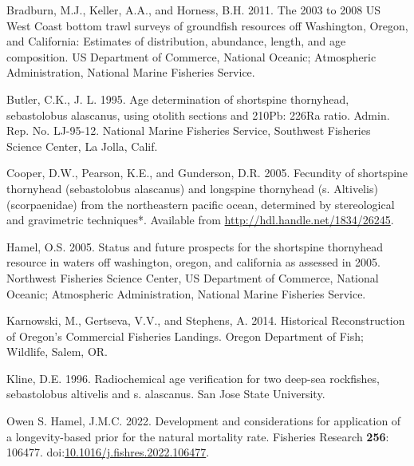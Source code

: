 \documentclass[11pt,
  english,
  letterpaper,
]{article}
\newlength{\cslhangindent}
\newenvironment{CSLReferences}[2] %
 {%
  \setlength{\parindent}{0pt}
  \ifodd #1 \everypar{\setlength{\hangindent}{\cslhangindent}}\ignorespaces\fi
  \ifnum #2 > 0
  \setlength{\parskip}{#2\baselineskip}
  \fi
 }%
 {}
\begin{document}
\hypertarget{refs}{}
\begin{CSLReferences}{1}{0}
\leavevmode{}%
Bradburn, M.J., Keller, A.A., and Horness, B.H. 2011. The 2003 to 2008 {US} {West} {Coast} bottom trawl surveys of groundfish resources off {Washington}, {Oregon}, and {California}: Estimates of distribution, abundance, length, and age composition. US Department of Commerce, National Oceanic; Atmospheric Administration, National Marine Fisheries Service.

\leavevmode{}%
Butler, C.K., J. L. 1995. Age determination of shortspine thornyhead, sebastolobus alascanus, using otolith sections and 210Pb: 226Ra ratio. Admin. Rep. No. LJ-95-12. National Marine Fisheries Service, Southwest Fisheries Science Center, La Jolla, Calif.

\leavevmode{}%
Cooper, D.W., Pearson, K.E., and Gunderson, D.R. 2005. Fecundity of shortspine thornyhead (sebastolobus alascanus) and longspine thornyhead (s. Altivelis) (scorpaenidae) from the northeastern pacific ocean, determined by stereological and gravimetric techniques*. Available from \url{http://hdl.handle.net/1834/26245}.

\leavevmode{}%
Hamel, O.S. 2005. Status and future prospects for the shortspine thornyhead resource in waters off washington, oregon, and california as assessed in 2005. Northwest Fisheries Science Center, US Department of Commerce, National Oceanic; Atmospheric Administration, National Marine Fisheries Service.

\leavevmode{}%
Karnowski, M., Gertseva, V.V., and Stephens, A. 2014. Historical {Reconstruction} of {Oregon}'s {Commercial} {Fisheries} {Landings}. Oregon Department of Fish; Wildlife, Salem, OR.

\leavevmode{}%
Kline, D.E. 1996. Radiochemical age verification for two deep-sea rockfishes, sebastolobus altivelis and s. alascanus. San Jose State University.

\leavevmode{}%
Owen S. Hamel, J.M.C. 2022. Development and considerations for application of a longevity-based prior for the natural mortality rate. Fisheries Research \textbf{256}: 106477. doi:\href{https://doi.org/10.1016/j.fishres.2022.106477}{10.1016/j.fishres.2022.106477}.


\end{CSLReferences}
\end{document}
